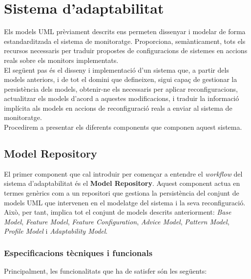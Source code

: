 
\chapter{Sistema d'adaptabilitat} %

\label{DissenySistema} %

Els models UML prèviament descrits ens permeten dissenyar i modelar de forma estandarditzada el sistema de monitoratge. Proporciona, semànticament, tots els recursos necessaris per traduir propostes de configuracions de sistemes en accions reals sobre els monitors implementats.\\

El següent pas és el disseny i implementació d'un sistema que, a partir dels models anteriors, i de tot el domini que defineixen, sigui capaç de gestionar la persistència dels models, obtenir-ne els necessaris per aplicar reconfiguracions, actualitzar els models d'acord a aquestes modificacions, i traduir la informació implícita als models en accions de reconfiguració reals a enviar al sistema de monitoratge.\\

Procedirem a presentar els diferents components que componen aquest sistema.

\section{Model Repository}

El primer component que cal introduir per començar a entendre el \textit{workflow} del sistema d'adaptabilitat és el \textbf{Model Repository}. Aquest component actua en termes genèrics com a un repositori que gestiona la persistència del conjunt de models UML que intervenen en el modelatge del sistema i la seva reconfiguració. Això, per tant, implica tot el conjunt de models descrits anteriorment: \textit{Base Model}, \textit{Feature Model}, \textit{Feature Configuration}, \textit{Advice Model}, \textit{Pattern Model}, \textit{Profile Model} i \textit{Adaptability Model}.\\

\subsection{Especificacions tècniques i funcionals}

Principalment, les funcionalitats que ha de satisfer són les següents:

